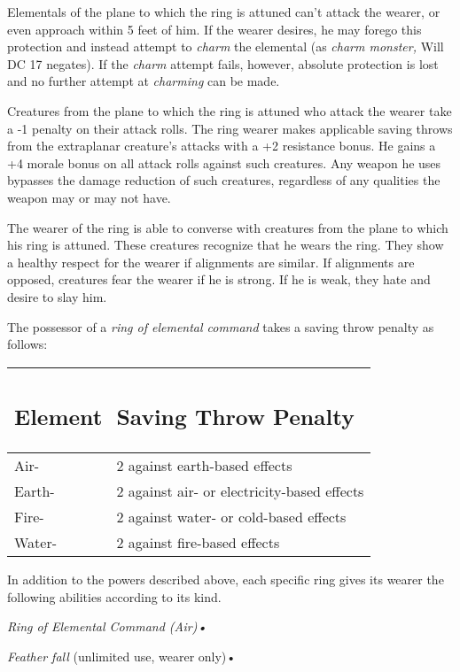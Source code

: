 \documentclass{article}
\begin{document}
Elementals of the plane to which the ring is attuned can't attack the wearer, or 
even approach within 5 feet of him. If the wearer desires, he may forego this protection 
and instead attempt to \textit{charm }the elemental (as \textit{charm monster, 
}Will DC 17 negates). If the \textit{charm }attempt fails, however, absolute protection 
is lost and no further attempt at \textit{charming }can be made.

Creatures from the plane to which the ring is attuned who attack the wearer take 
a -1 penalty on their attack rolls. The ring wearer makes applicable saving throws 
from the extraplanar creature's attacks with a +2 resistance bonus. He gains a 
+4 morale bonus on all attack rolls against such creatures. Any weapon he uses 
bypasses the damage reduction of such creatures, regardless of any qualities the 
weapon may or may not have.

The wearer of the ring is able to converse with creatures from the plane to which 
his ring is attuned. These creatures recognize that he wears the ring. They show 
a healthy respect for the wearer if alignments are similar. If alignments are opposed, 
creatures fear the wearer if he is strong. If he is weak, they hate and desire 
to slay him.

The possessor of a \textit{ring of elemental command }takes a saving throw penalty 
as follows:

\begin{tabular}{|>{\raggedright}p{34pt}|>{\raggedright}p{164pt}|}
\hline
\subsection*{E\textbf{lement}} & \subsection*{S\textbf{aving Throw Penalty}}\tabularnewline
\hline
Air- & 2 against earth-based effects\tabularnewline
\hline
Earth- & 2 against air- or electricity-based effects\tabularnewline
\hline
Fire- & 2 against water- or cold-based effects\tabularnewline
\hline
Water- & 2 against fire-based effects\tabularnewline
\hline
\end{tabular}

In addition to the powers described above, each specific ring gives its wearer 
the following abilities according to its kind.

\textit{Ring of Elemental Command (Air)• }

\textit{Feather fall }(unlimited use, wearer only)• 
\end{document}
